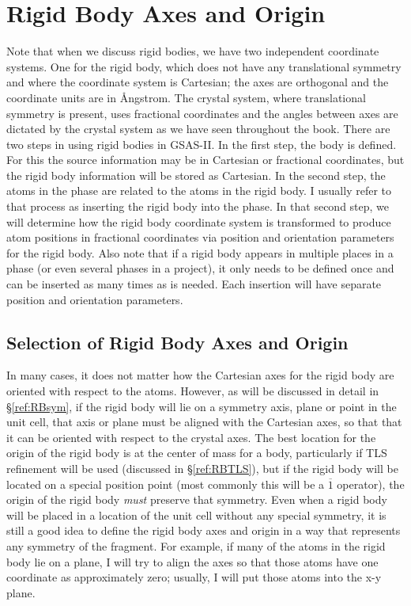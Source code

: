 \section{Rigid Body Axes and Origin}
Note that when we discuss rigid bodies, we have two independent coordinate systems. One for the rigid body, which does not have any translational symmetry and where the coordinate system is Cartesian; the axes are orthogonal and the coordinate units are in Ångstrom. The crystal system, where translational symmetry is present, uses fractional coordinates and the angles between axes are dictated by the crystal system as we have seen throughout the book. There are two steps in using rigid bodies in GSAS-II. In the first step, the body is defined. For this the source information may be in Cartesian or fractional coordinates, but the rigid body information will be stored as Cartesian. In the second step, the atoms in the phase are related to the atoms in the rigid body. I usually refer to that process as inserting the rigid body into the phase. In that second step, we will determine how the rigid body coordinate system is transformed to produce atom positions in fractional coordinates via position and orientation parameters for the rigid body. Also note that if a rigid body appears in multiple places in a phase (or even several phases in a project), it only needs to be defined once and can be inserted as many times as is needed. Each insertion will have separate position and orientation parameters.

\subsection{Selection of Rigid Body Axes and Origin}
In many cases, it does not matter how the Cartesian axes for the rigid body are oriented with respect to the atoms. However, as will be discussed in detail in \S\ref{ref:RBsym}, if the rigid body will lie on a symmetry axis, plane or point in the unit cell, that axis or plane must be aligned with the Cartesian axes, so that that it can be oriented with respect to the crystal axes. The best location for the origin of the rigid body is at the center of mass for a body, particularly if TLS refinement will be used (discussed in \S\ref{ref:RBTLS}), but if the rigid body will be located on a special position point (most commonly this will be a $\overline{1}$ operator), the origin of the rigid body \textit{must} preserve that symmetry. Even when a rigid body will be placed in a location of the unit cell without any special symmetry, it is still a good idea to define the rigid body axes and origin in a way that represents any symmetry of the fragment. For example, if many of the atoms in the rigid body lie on a plane, I will try to align the axes so that those atoms have one coordinate as approximately zero; usually, I will put those atoms into the x-y plane. 


